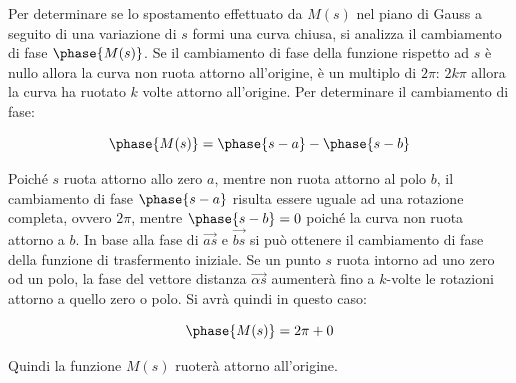 \documentclass{article}
\numberwithin{equation}{subsection}
\begin{document}
\begin{center}
\end{center}

Per determinare se lo spostamento effettuato da $M(s)$ nel piano di Gauss a seguito di una variazione di $s$ formi una curva chiusa, si analizza il cambiamento di 
fase $\phase{M(s)}$. Se il cambiamento di fase della funzione rispetto ad $s$ è nullo allora la curva non ruota attorno all'origine, è un multiplo di $2\pi$: $2k\pi$ 
allora la curva ha ruotato $k$ volte attorno all'origine. Per determinare il cambiamento di fase: 

\begin{equation}
    \phase{M(s)}=\phase{s-a}-\phase{s-b}\\
\end{equation}

Poiché $s$ ruota attorno allo zero $a$, mentre non ruota attorno al polo $b$, il cambiamento di fase $\phase{s-a}$ risulta essere uguale ad una rotazione completa, ovvero 
$2\pi$, mentre $\phase{s-b}=0$ poiché la curva non ruota attorno a $b$. In base alla fase di $\vec{as}$ e $\vec{bs}$ si può ottenere il cambiamento di fase della funzione 
di trasfermento iniziale. Se un punto $s$ ruota intorno ad uno zero od un polo, la fase del vettore distanza $\vec{\alpha s}$ aumenterà fino a $k$-volte le rotazioni 
attorno a quello zero o polo. Si avrà quindi in questo caso:

\begin{equation}
    \phase{M(s)}=2\pi+0
\end{equation}

Quindi la funzione $M(s)$ ruoterà attorno all'origine. 
\end{document}
